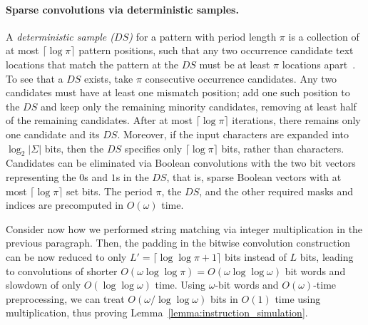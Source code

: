 \documentclass[12pt]{article}
\newcommand{\W}{{\omega}}
\begin{document}
\paragraph{\bf Sparse convolutions via deterministic samples.}
%
A {\em deterministic sample ($DS$)} for a pattern with period length
$\pi$ is a collection of at most $\lceil\log \pi\rceil$ pattern
positions, such that any two occurrence candidate text locations that
match the pattern at the $DS$ must be at least $\pi$ locations
apart~\cite{vishkin:90}.  To see that a $DS$ exists, take $\pi$
consecutive occurrence candidates. %
Any two %
candidates must have at least one mismatch position; add one such
position to the $DS$ and keep only the remaining minority candidates,
removing at least half of the remaining candidates.  After at most
$\lceil \log \pi\rceil$ iterations, there remains only one candidate
and its $DS$.  Moreover, if the input characters are expanded into
$\log_2 |\Sigma|$ bits, then the $DS$ specifies only $\lceil \log
\pi\rceil$ bits, rather than characters.
%
Candidates can be eliminated %
via Boolean convolutions with the two bit vectors
representing the $0$s and $1$s in the $DS$, 
that is, sparse Boolean vectors with at most $\lceil \log\pi \rceil$ set bits.
The period $\pi$, the $DS$, and the other required masks and indices
are precomputed in $O(\W)$ time.

Consider now how we performed string matching via integer
multiplication in the previous paragraph.  Then, the padding in the
bitwise convolution construction can be now reduced to only $L'=\lceil
\log\log \pi+1\rceil $ bits instead of $L$ bits, leading to
convolutions of shorter $O(\W\log\log\pi) = O(\W\log\log\W)$ bit words
and slowdown of only $O(\log\log\W)$ time. Using $\W$-bit words and
$O(\W)$-time preprocessing, we can treat $O(\W/\log\log\W)$ bits in
$O(1)$ time using multiplication, thus proving
Lemma~\ref{lemma:instruction_simulation}.
\end{document}
